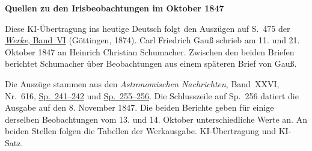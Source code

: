 \clearpage\thispagestyle{empty}
\begin{center}\textbf{Quellen zu den Irisbeobachtungen im Oktober 1847}\end{center}
\noindent Diese KI-Übertragung ins heutige Deutsch folgt den Auszügen auf S.~475 der \href{https://gdz.sub.uni-goettingen.de/id/PPN236007467}{\textit{Werke}, Band~VI} (Göttingen, 1874). Carl Friedrich Gauß schrieb am 11. und 21. Oktober 1847 an Heinrich Christian Schumacher. Zwischen den beiden Briefen berichtet Schumacher über Beobachtungen aus einem späteren Brief von Gauß.
\par\smallskip\noindent Die Auszüge stammen aus den \textit{Astronomischen Nachrichten}, Band~XXVI, Nr.~616, \href{https://api.digitale-sammlungen.de/iiif/image/v2/bsb10049451_00129/full/1800,/0/default.jpg}{Sp.~241--242} und \href{https://api.digitale-sammlungen.de/iiif/image/v2/bsb10049451_00136/full/1800,/0/default.jpg}{Sp.~255--256}. Die Schlusszeile auf Sp.~256 datiert die Ausgabe auf den 8. November 1847. Die beiden Berichte geben für einige derselben Beobachtungen vom 13. und 14. Oktober unterschiedliche Werte an. An beiden Stellen folgen die Tabellen der Werkausgabe. KI-Übertragung und KI-Satz.
\clearpage
